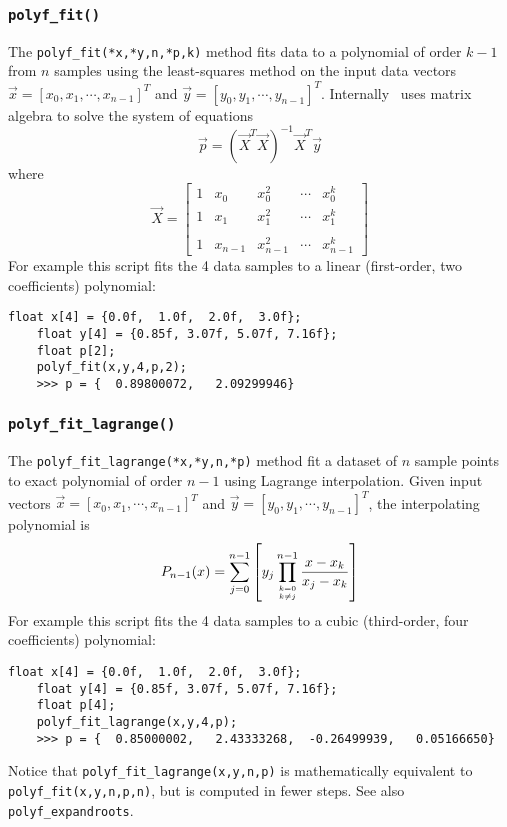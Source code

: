 \subsubsection{{\tt polyf\_fit()}}
\label{module:math:poly:polyf_fit}
The {\tt polyf\_fit(*x,*y,n,*p,k)} method
fits data to a polynomial of order $k-1$ from $n$ samples using the
least-squares method on the input data vectors
$\vec{x}=[x_0,x_1,\cdots,x_{n-1}]^T$ and 
$\vec{y}=[y_0,y_1,\cdots,y_{n-1}]^T$.
Internally \liquid\
uses matrix algebra to solve the system of equations
%
\begin{equation}
\label{eqn:math:poly:syseq}
    \vec{p} = \left(\vec{X}^T\vec{X}\right)^{-1}\vec{X}^T\vec{y}
\end{equation}
%
where
%
\begin{equation}
\label{eqn:math:poly:polyfit}
    \vec{X} = 
    \begin{bmatrix}
        1   & x_0       & x_0^2     & \cdots    & x_0^{k}     \\
        1   & x_1       & x_1^2     & \cdots    & x_1^{k}     \\
        \\
        1   & x_{n-1}   & x_{n-1}^2 & \cdots    & x_{n-1}^{k}
    \end{bmatrix}
\end{equation}
%
For example this script fits the 4 data samples to a linear
(first-order, two coefficients) polynomial:
%
\begin{Verbatim}[fontsize=\small]
    float x[4] = {0.0f,  1.0f,  2.0f,  3.0f};
    float y[4] = {0.85f, 3.07f, 5.07f, 7.16f};
    float p[2];
    polyf_fit(x,y,4,p,2);
    >>> p = {  0.89800072,   2.09299946}
\end{Verbatim}


\subsubsection{{\tt polyf\_fit\_lagrange()}}
\label{module:math:poly:polyf_fit_lagrange}
The {\tt polyf\_fit\_lagrange(*x,*y,n,*p)} method fit a dataset
of $n$ sample points to exact polynomial of order $n-1$ using
Lagrange interpolation.
Given input vectors
$\vec{x}=[x_0,x_1,\cdots,x_{n-1}]^T$ and 
$\vec{y}=[y_0,y_1,\cdots,y_{n-1}]^T$, the interpolating polynomial is
%
\begin{equation}
\label{eqn:math:poly:polyfit_lagrange}
    P_{n-1}(x) =
        \sum_{j=0}^{n-1} {
            \left[
            y_j
            \prod_{{k=0}\atop{k \ne j}}^{n-1} {
                \frac{x-x_k}{x_j-x_k}
            }
            \right]
        }
\end{equation}
%
For example this script fits the 4 data samples to a cubic
(third-order, four coefficients) polynomial:
%
\begin{Verbatim}[fontsize=\small]
    float x[4] = {0.0f,  1.0f,  2.0f,  3.0f};
    float y[4] = {0.85f, 3.07f, 5.07f, 7.16f};
    float p[4];
    polyf_fit_lagrange(x,y,4,p);
    >>> p = {  0.85000002,   2.43333268,  -0.26499939,   0.05166650}
\end{Verbatim}
%
Notice that {\tt polyf\_fit\_lagrange(x,y,n,p)}
is mathematically equivalent to {\tt polyf\_fit(x,y,n,p,n)},
but is computed in fewer steps.
%
See also {\tt polyf\_expandroots}.

